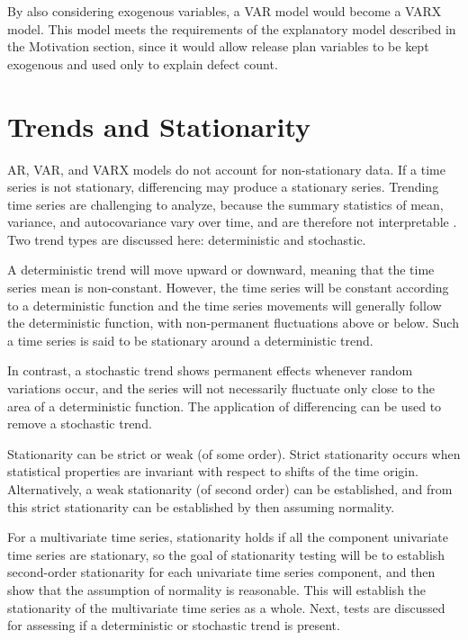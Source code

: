 \documentclass[letterpaper]{report}
\begin{document}
By also considering exogenous variables, a VAR model would become a VARX model. This model meets the requirements of the explanatory model described in the Motivation section, since it would allow release plan variables to be kept exogenous and used only to explain defect count.

\section*{Trends and Stationarity}
AR, VAR, and VARX models do not account for non-stationary data. If a time series is not stationary, differencing may produce a stationary series. Trending time series are challenging to analyze, because the summary statistics of mean, variance, and autocovariance vary over time, and are therefore not interpretable \cite{franses1998time}. Two trend types are discussed here: deterministic and stochastic.

A deterministic trend will move upward or downward, meaning that the time series mean is non-constant. However, the time series will be constant according to a deterministic function and the time series movements will generally follow the deterministic function, with non-permanent fluctuations above or below. Such a time series is said to be stationary around a deterministic trend.

In contrast, a stochastic trend shows permanent effects whenever random variations occur, and the series will not necessarily fluctuate only close to the area of a deterministic function. The application of differencing can be used to remove a stochastic trend. 

Stationarity can be strict or weak (of some order). Strict stationarity occurs when statistical properties are invariant with respect to shifts of the time origin\cite{moon2000mathematical}. Alternatively, a weak stationarity (of second order) can be established, and from this strict stationarity can be established by then assuming normality\cite{box_jenkins_reinsel_2008}.

For a multivariate time series, stationarity holds if all the component univariate time series are stationary\cite{yang2005stationarity}, so the goal of stationarity testing will be to establish second-order stationarity for each univariate time series component, and then show that the assumption of normality is reasonable. This will establish the stationarity of the multivariate time series as a whole. Next, tests are discussed for assessing if a deterministic or stochastic trend is present.
\end{document}
